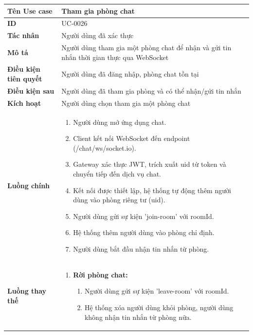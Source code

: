 {
\renewcommand{\arraystretch}{1.5}

\begin{tabularx}{\textwidth}{|>{\raggedright\arraybackslash}X|>{\raggedright\arraybackslash}X|}
\hline
\textbf{Tên Use case} & Tham gia phòng chat \\
\hline
\textbf{ID} & UC-0026 \\
\hline
\textbf{Tác nhân} & Người dùng đã xác thực \\
\hline
\textbf{Mô tả} & Người dùng tham gia một phòng chat để nhận và gửi tin nhắn thời gian thực qua WebSocket \\
\hline
\textbf{Điều kiện tiên quyết} & Người dùng đã đăng nhập, phòng chat tồn tại \\
\hline
\textbf{Điều kiện sau} & Người dùng đã tham gia phòng và có thể nhận/gửi tin nhắn \\
\hline
\textbf{Kích hoạt} & Người dùng chọn tham gia một phòng chat \\
\hline
\textbf{Luồng chính} &
\begin{enumerate}
    \item Người dùng mở ứng dụng chat.
    \item Client kết nối WebSocket đến endpoint (/chat/ws/socket.io).
    \item Gateway xác thực JWT, trích xuất uid từ token và chuyển tiếp đến dịch vụ chat.
    \item Kết nối được thiết lập, hệ thống tự động thêm người dùng vào phòng riêng tư (uid).
    \item Người dùng gửi sự kiện 'join-room' với roomId.
    \item Hệ thống thêm người dùng vào phòng chỉ định.
    \item Người dùng bắt đầu nhận tin nhắn từ phòng.
\end{enumerate} \\
\hline
\textbf{Luồng thay thế} &
\begin{enumerate}
    \item \textbf{Rời phòng chat:}
    \begin{enumerate}
        \item[7A.] Người dùng gửi sự kiện 'leave-room' với roomId.
        \item[8A.] Hệ thống xóa người dùng khỏi phòng, người dùng không nhận tin nhắn từ phòng nữa.
    \end{enumerate}
\end{enumerate} \\

\end{tabularx}}
